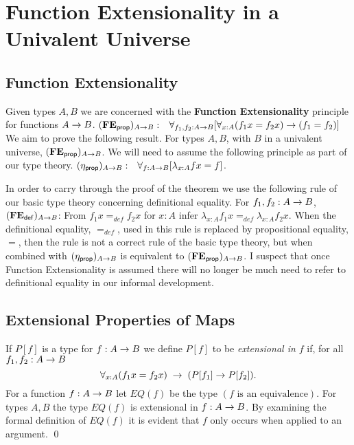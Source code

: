 
\section{Function Extensionality in a Univalent Universe}

\subsection{Function Extensionality}
Given types $A,B$ we are concerned with the {\bf Function Extensionality} principle for functions $A\rightarrow B$.
{\bf $({\bf FE_{\sf prop}})_{A\rightarrow B}:\;\;$} 
  $\forall_{f_1,f_2:A\rightarrow B}[\forall_{x:A}(f_1x=f_2x)\rightarrow (f_1=f_2)]$
We aim to prove the following result.
\label{fe:thm}\label{thm:4.2} For types $A,B$, with $B$ in a univalent universe, 
$({\bf FE_{\sf prop}})_{A\rightarrow B}$.
We will need to assume the following principle as part of our type theory.
{\bf $({\eta_{\sf prop}})_{A\rightarrow B}:\;\;$} 
  $\forall_{f:A\rightarrow B}[\lambda_{x:A}fx = f]$.

In order to carry through the proof of the theorem we use the following rule of our basic type theory concerning definitional equality.  For $f_1,f_2:A\rightarrow B$,
$({\bf FE_{\sf def}})_{A\rightarrow B}$: From $f_1x=_{def}f_2x$ for $x:A$ infer $\lambda_{x:A}f_1x =_{def} \lambda_{x:A}f_2x$.
When the definitional equality, $=_{def}$,  used in this rule is replaced by propositional equality, $=$, then the rule is not a correct rule of the basic type theory, but when combined with $({\eta_{\sf prop}})_{A\rightarrow B}$ is equivalent to $({\bf FE_{\sf prop}})_{A\rightarrow B}$.  I suspect that once Function Extensionality is assumed there will no longer be much need to refer to definitional equality in our informal development.


\subsection{Extensional Properties of Maps}
If $P[f]$ is a type for $f:A\rightarrow B$ we define $P[f]$ to be {\em extensional in $f$} if, for all $f_1,f_2:A\rightarrow B$
  \[ \forall_{x:A}(f_1x=f_2x)\;\rightarrow\; (P[f_1]\rightarrow P[f_2]).\]
 For a function $f:A\rightarrow B$ let $EQ(f)$ be the type 
{\em $(f\mbox{ is an equivalence})$}.
\label{prop:4.5}
For types $A,B$ the type $EQ(f)$ is extensional in $f:A\rightarrow B$.
\proof  By examining the formal definition of $EQ(f)$ it is evident that $f$ only occurs when applied to an argument.
\qed

